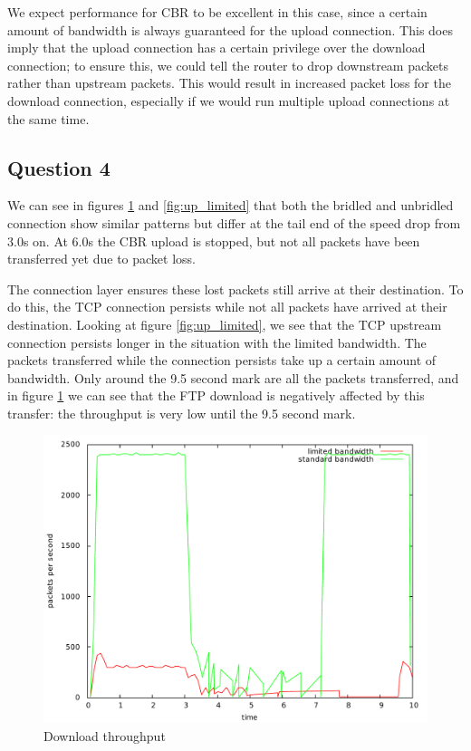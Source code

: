 \documentclass[10pt,a4paper]{article}
\begin{document}
We expect performance for CBR to be excellent in this case, since a
certain amount of bandwidth is always guaranteed for the upload
connection. This does imply that the upload connection has a certain
privilege over the download connection; to ensure this, we could tell
the router to drop downstream packets rather than upstream
packets. This would result in increased packet loss for the download
connection, especially if we would run multiple upload connections at
the same time.

\subsection{Question 4}

We can see in figures \ref{fig:down_limited} and \ref{fig:up_limited} that
both the bridled and unbridled connection show similar patterns but
differ at the tail end of the speed drop from 3.0s on. At 6.0s the CBR
upload is stopped, but not all packets have been transferred yet due
to packet loss.

The connection layer ensures these lost packets still arrive at their
destination. To do this, the TCP connection persists while not all
packets have arrived at their destination. Looking at figure
\ref{fig:up_limited}, we see that the TCP upstream connection persists
longer in the situation with the limited bandwidth. The packets
transferred while the connection persists take up a certain amount of
bandwidth. Only around the 9.5 second mark are all the packets
transferred, and in figure \ref{fig:down_limited} we can see that the FTP
download is negatively affected by this transfer: the throughput is
very low until the 9.5 second mark.

\begin{figure}[p]
    \centering
    \includegraphics[width=\textwidth]{../part1/q4/plots/4-down.pdf}
    \caption{Download throughput}
    \label{fig:down_limited}
\end{figure}
\end{document}
